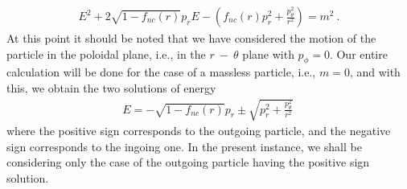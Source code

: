 \documentclass[aps,prd,showpacs,nofootinbib,floats,floatfix,preprintnumbers,groupedaddress,twocolumn]{revtex4-1}
\begin{document}
%
%
%
%
\begin{eqnarray}
E^{2}+2\sqrt{1-f_{nc}(r)}p_{r}E-\left(f_{nc}(r)p_{r}^{2}+\frac{p_{\theta}^{2}}{r^{2}}\right)=m^{2}~.
\end{eqnarray}   
At this point it should be noted that we have considered  the motion of the particle in  the poloidal plane, i.e., in the $r~ - ~\theta$ plane with $p_{\phi}=0$. Our entire calculation will be done for the case of a massless particle, i.e., $m=0$, and with this, we obtain the two solutions of energy
%
%
%
\begin{eqnarray}
E=-\sqrt{1-f_{nc}(r)}p_{r}\pm\sqrt{p_{r}^{2}+\frac{p_{\theta}^{2}}{r^{2}}}~
\end{eqnarray}
%
%
%
where the positive sign corresponds to the outgoing particle, and the negative sign corresponds to the ingoing one. In the present instance, we shall be considering only the case of  the outgoing particle having the positive sign solution. 
\end{document}
